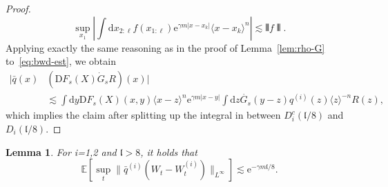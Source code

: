\documentclass[11pt, a4paper]{scrartcl}
\numberwithin{equation}{section}
\theoremstyle{plain}
\newtheorem{lemma}[foo]{Lemma}
\theoremstyle{remark}
\newcommand{\mathD}{\mathrm{D}}
\newcommand{\mathd}{\mathrm{d}}
\newcommand{\mathe}{\mathrm{e}}
\begin{document}
\begin{proof}
	\[ \sup_{x_1} \left| \int \mathd x_{2 : \ell} f (x_{1 : \ell})
		\mathe^{\gamma m | x - x_k |} \langle x - x_k \rangle^n \right| \lesssim
		\interleave f \interleave . \]
	Applying exactly the same reasoning as in the proof of Lemma~\ref{lem:rho-G}
	to~\eqref{eq:bwd-est}, we obtain
	\begin{align*}
		| \bar{q} (x) & (\mathD F_s (X)  \dot{G}_s R) (x) | \\
		              & \lesssim \int \mathd y
		\mathD F_s (X) (x, y) \langle x - z \rangle^n \mathe^{\gamma m | x - y |}
		\int \mathd z \dot{G_s} (y - z) q^{(i)} (z) \langle z \rangle^{- n} R
		(z),
	\end{align*}
	which implies the claim after splitting up the integral in between $D_i^c
		(\mathfrak{l}/ 8)$ and $D_i (\mathfrak{l}/ 8)$.
\end{proof}

\begin{lemma}
	\label{lem:corr-W-Wi}For i=1,2 and $\mathfrak{l}> 8$, it holds that
	\[ \mathbb{E} [\sup_t \| \bar{q}^{(i)} (W_t - W_t^{(i)}) \|_{L^{\infty}}]
		\lesssim \mathe^{- \gamma m\mathfrak{l}/ 8} . \]
\end{lemma}
\end{document}
